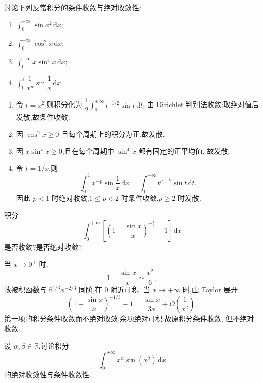 \begin{example}
  讨论下列反常积分的条件收敛与绝对收敛性:
  \begin{enumerate}
    \item $\displaystyle\int_0^{+\infty}\sin x^2\,\mathrm{d}x$;
    \item $\displaystyle\int_0^{+\infty}\cos^2x\,\mathrm{d}x$;
    \item $\displaystyle\int_0^{+\infty}x\sin^4x\,\mathrm{d}x$;
    \item $\displaystyle\int_0^1\dfrac{1}{x^p}\sin\dfrac{1}{x}\,\mathrm{d}x$.
  \end{enumerate}
\end{example}
\exampleblank

\begin{solution}
  \begin{enumerate}
    \item 令 $t=x^2$,则积分化为
          $\dfrac{1}{2}\displaystyle\int_0^{+\infty}t^{-1/2}\sin t\,\mathrm{d}t$,
          由 Dirichlet 判别法收敛;取绝对值后发散,故条件收敛.
    \item 因 $\cos^2x\geq0$ 且每个周期上的积分为正,故发散.
    \item 因 $x\sin^4x\geq0$,且在每个周期中 $\sin^4x$ 都有固定的正平均值,
          故发散.
    \item 令 $t=1/x$,则
          \[
            \int_0^1x^{-p}\sin\dfrac{1}{x}\,\mathrm{d}x
            =\int_1^{+\infty}t^{p-2}\sin t\,\mathrm{d}t.
          \]
          因此 $p<1$ 时绝对收敛,$1\leq p<2$ 时条件收敛,$p\geq2$ 时发散.
  \end{enumerate}
\end{solution}

\begin{example}
  积分
  \[
    \int_0^{+\infty}\left[\left(1-\dfrac{\sin x}{x}\right)^{-\frac{1}{3}}-1\right]\,\mathrm{d}x
  \]
  是否收敛?是否绝对收敛?
\end{example}
\exampleblank

\begin{solution}
  当 $x\to0^+$ 时,
  \[
    1-\dfrac{\sin x}{x}\sim\dfrac{x^2}{6},
  \]
  故被积函数与 $6^{1/3}x^{-2/3}$ 同阶,在 $0$ 附近可积.
  当 $x\to+\infty$ 时,由 Taylor 展开
  \[
    \left(1-\dfrac{\sin x}{x}\right)^{-1/3}-1
    =\dfrac{\sin x}{3x}+O\left(\dfrac{1}{x^2}\right).
  \]
  第一项的积分条件收敛而不绝对收敛,余项绝对可积.故原积分条件收敛,
  但不绝对收敛.
\end{solution}

\begin{example}
  设 $\alpha,\beta\in\mathbb{R}$,讨论积分
  \[
    \int_0^{+\infty}x^\alpha\sin(x^\beta)\,\mathrm{d}x
  \]
  的绝对收敛性与条件收敛性.
\end{example}
\exampleblank

